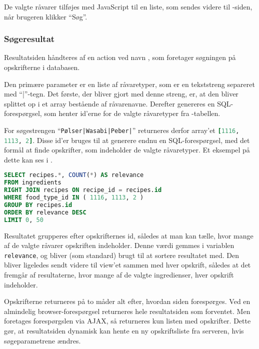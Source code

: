 De valgte råvarer tilføjes med JavaScript til en liste, som sendes videre til -siden, når brugeren klikker ``Søg''.

\subsubsection{Søgeresultat}
Resultatsiden håndteres af en action ved navn , som foretager søgningen på opskrifterne i databasen. 

Den primære parameter er en liste af råvaretyper, som er en tekststreng separeret med ``|''-tegn. Det første, der bliver gjort med denne streng, er, at den bliver splittet op i et array bestående af råvarenavne. Derefter genereres en SQL-forespørgsel, som henter id'erne for de valgte råvaretyper fra -tabellen.

For søgestrengen ``\texttt{Pølser|Wasabi|Peber|}'' returneres derfor array'et \lstinline[language=Ruby]{[1116, 1113, 2]}. Disse id'er bruges til at generere endnu en SQL-forespørgsel, med det formål at finde opskrifter, som indeholder de valgte råvaretyper. Et eksempel på dette kan ses i .

\begin{lstlisting}[caption={Ved en søgning på ``Pølser'', ``Wasabi'' og ``Peber'' udføres denne SQL-forespørgsel.},label=lst:soegeresultat-sql,language=SQL]
SELECT recipes.*, COUNT(*) AS relevance
FROM ingredients
RIGHT JOIN recipes ON recipe_id = recipes.id
WHERE food_type_id IN ( 1116, 1113, 2 )
GROUP BY recipes.id
ORDER BY relevance DESC
LIMIT 0, 50
\end{lstlisting}

Resultatet grupperes efter opskrifternes id, således at man kan tælle, hvor mange af de valgte råvarer opskriften indeholder. Denne værdi gemmes i variablen \texttt{relevance}, og bliver (som standard) brugt til at sortere resultatet med. Den bliver ligeledes sendt videre til view'et sammen med hver opskrift, således at det fremgår af resultaterne, hvor mange af de valgte ingredienser, hver opskrift indeholder.

Opskrifterne returneres på to måder alt efter, hvordan siden forespørges. Ved en almindelig browser-forespørgsel returneres hele resultatsiden som forventet. Men foretages forespørgslen via AJAX, så returneres kun listen med opskrifter. Dette gør, at resultatsiden dynamisk kan hente en ny opskriftsliste fra serveren, hvis \fx søgeparametrene ændres.

